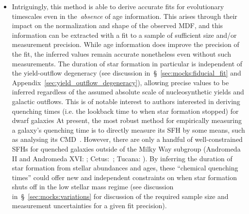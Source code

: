 \documentclass[ms.tex]{subfiles}
\begin{document}
\begin{itemize}
	\item Intriguingly, this method is able to derive accurate fits for
	evolutionary timescales even in the~\textit{absence} of age information.
	This arises through their impact on the normalization and shape of the
	observed MDF, and this information can be extracted with a fit to a sample
	of sufficient size and/or measurement precision.
	While age information does improve the precision of the fit, the inferred
	values remain accurate nonetheless even without such measurements.
	The duration of star formation in particular is independent of the
	yield-outflow degeneracy (see discussion in~\S~\ref{sec:mocks:fiducial_fit}
	and Appendix~\ref{sec:yield_outflow_degeneracy}), allowing precise values
	to be inferred regardless of the assumed absolute scale of nucleosynthetic
	yields and galactic outflows.
	This is of notable interest to authors interested in deriving quenching
	times (i.e. the lookback time to when star formation stopped) for dwarf
	galaxies
	At present, the most robust method for empirically measuring a galaxy's
	quenching time is to directly measure its SFH by some means, such as
	analysing its CMD~\citep[e.g.][]{Sohn2013, Weisz2015}.
	However, there are only a handful of well-constrained SFHs for quenched
	galaxies outside of the Milky Way subgroup (Andromeda II and Andromeda XVI:
	\citealp{Weisz2014a}; Cetus:~\citealp{Monelli2010a}; Tucana:
	\citealp{Monelli2010b}).
	By inferring the duration of star formation from stellar abundances and
	ages, these ``chemical quenching times'' could offer new and independent
	constraints on when star formation shuts off in the low stellar mass
	regime (see discussion in~\S~\ref{sec:mocks:variations} for discussion of
	the required sample size and measurement uncertainties for a given fit
	precision).



\end{itemize}
\end{document}
